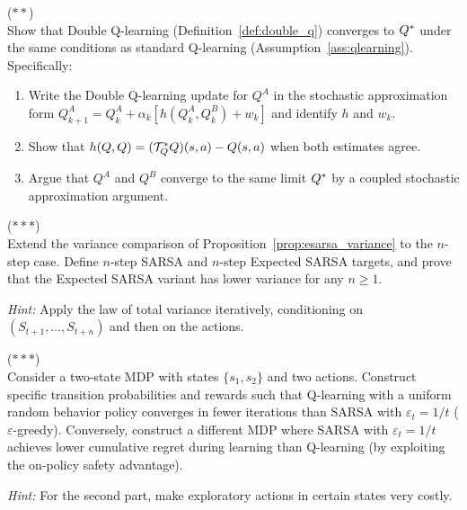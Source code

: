 \documentclass[11pt,a4paper]{article}
\begin{document}
\begin{exercise}
\textnormal{(\(**\))} \\
Show that Double Q-learning (Definition~\ref{def:double_q})
converges to $Q^*$ under the same conditions as standard
Q-learning (Assumption~\ref{ass:qlearning}). Specifically:
\begin{enumerate}[nosep]
  \item[(a)] Write the Double Q-learning update for $Q^A$ in the
    stochastic approximation form $Q^A_{k+1} = Q^A_k + \alpha_k
    [h(Q^A_k, Q^B_k) + w_k]$ and identify $h$ and $w_k$.
  \item[(b)] Show that $h(Q, Q) = (\mathcal{T}^*_Q Q)(s,a)
    - Q(s,a)$ when both estimates agree.
  \item[(c)] Argue that $Q^A$ and $Q^B$ converge to the same
    limit $Q^*$ by a coupled stochastic approximation argument.
\end{enumerate}
\end{exercise}

\begin{exercise}
\textnormal{(\(***\))} \\
Extend the variance comparison of
Proposition~\ref{prop:esarsa_variance} to the $n$-step case.
Define $n$-step SARSA and $n$-step Expected SARSA targets, and
prove that the Expected SARSA variant has lower variance for any
$n \geq 1$.

\textit{Hint:} Apply the law of total variance iteratively,
conditioning on $(S_{t+1}, \ldots, S_{t+n})$ and then on the
actions.
\end{exercise}

\begin{exercise}
\textnormal{(\(***\))} \\
Consider a two-state MDP with states $\{s_1, s_2\}$ and two
actions. Construct specific transition probabilities and rewards
such that Q-learning with a uniform random behavior policy converges
in fewer iterations than SARSA with $\varepsilon_t = 1/t$
($\varepsilon$-greedy). Conversely, construct a different MDP where
SARSA with $\varepsilon_t = 1/t$ achieves lower cumulative regret
during learning than Q-learning (by exploiting the on-policy safety
advantage).

\textit{Hint:} For the second part, make exploratory actions in
certain states very costly.
\end{exercise}
\end{document}

